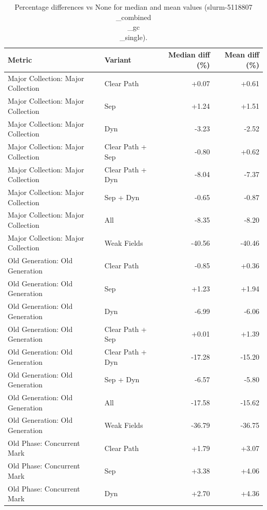 \begin{table}[t]
\centering
\caption{Percentage differences vs None for median and mean values (slurm-5118807\\_combined\\_gc\\_single).}
\label{tab:gc_metric_pct_diff_slurm-5118807\\_combined\\_gc\\_single}
\begin{tabular}{llrr}
\toprule
Metric & Variant & Median diff (\%) & Mean diff (\%) \\
\midrule
Major Collection: Major Collection & Clear Path & +0.07 & +0.61 \\
Major Collection: Major Collection & Sep & +1.24 & +1.51 \\
Major Collection: Major Collection & Dyn & -3.23 & -2.52 \\
Major Collection: Major Collection & Clear Path + Sep & -0.80 & +0.62 \\
Major Collection: Major Collection & Clear Path + Dyn & -8.04 & -7.37 \\
Major Collection: Major Collection & Sep + Dyn & -0.65 & -0.87 \\
Major Collection: Major Collection & All & -8.35 & -8.20 \\
Major Collection: Major Collection & Weak Fields & -40.56 & -40.46 \\
Old Generation: Old Generation & Clear Path & -0.85 & +0.36 \\
Old Generation: Old Generation & Sep & +1.23 & +1.94 \\
Old Generation: Old Generation & Dyn & -6.99 & -6.06 \\
Old Generation: Old Generation & Clear Path + Sep & +0.01 & +1.39 \\
Old Generation: Old Generation & Clear Path + Dyn & -17.28 & -15.20 \\
Old Generation: Old Generation & Sep + Dyn & -6.57 & -5.80 \\
Old Generation: Old Generation & All & -17.58 & -15.62 \\
Old Generation: Old Generation & Weak Fields & -36.79 & -36.75 \\
Old Phase: Concurrent Mark & Clear Path & +1.79 & +3.07 \\
Old Phase: Concurrent Mark & Sep & +3.38 & +4.06 \\
Old Phase: Concurrent Mark & Dyn & +2.70 & +4.36 \\

\end{tabular}
\end{table}
